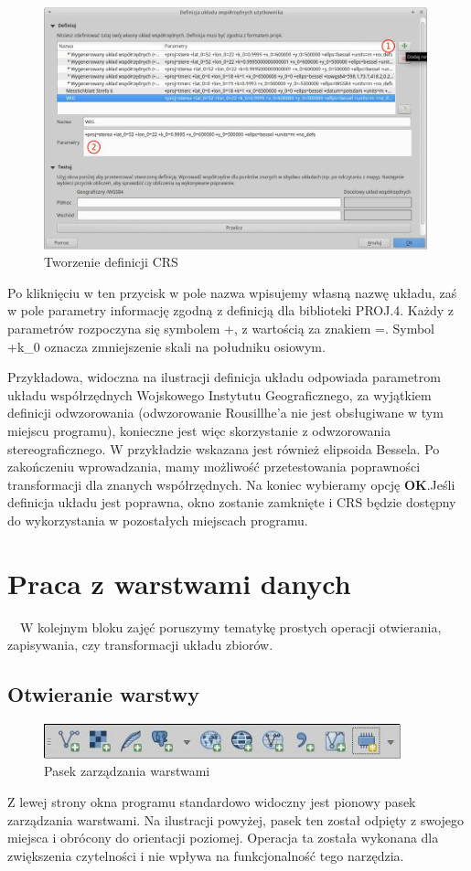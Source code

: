 \documentclass[12pt,a4paper]{book}
\begin{document}
\begin{figure}[ht]
	\centering
	\includegraphics[height=7cm]{002-crs.jpg}
	\caption{Tworzenie definicji CRS}
\end{figure}

Po kliknięciu w ten przycisk w pole nazwa wpisujemy własną nazwę układu, zaś w pole parametry informację zgodną z definicją dla biblioteki PROJ.4. Każdy z parametrów rozpoczyna się symbolem +, z wartością za znakiem =. Symbol +k\_0 oznacza zmniejszenie skali na południku osiowym.

Przykładowa, widoczna na ilustracji definicja układu odpowiada parametrom układu współrzędnych Wojskowego Instytutu Geograficznego, za wyjątkiem definicji odwzorowania (odwzorowanie Rousillhe'a nie jest obsługiwane w tym miejscu programu), konieczne jest więc skorzystanie z odwzorowania stereograficznego. W przykładzie wskazana jest również elipsoida Bessela. Po zakończeniu wprowadzania, mamy możliwość przetestowania poprawności transformacji dla znanych współrzędnych. Na koniec wybieramy opcję \textbf{OK}.Jeśli definicja układu jest poprawna, okno zostanie zamknięte i CRS będzie dostępny do wykorzystania w pozostałych miejscach programu.

\section{Praca z warstwami danych}
\ \ W kolejnym bloku zajęć poruszymy tematykę prostych operacji otwierania, zapisywania, czy transformacji układu zbiorów.

\subsection{Otwieranie warstwy}
\begin{figure}[ht]
	\centering
	\includegraphics[height=1cm]{002-pasek-warstwy.jpg}
	\caption{Pasek zarządzania warstwami}
\end{figure}
Z lewej strony okna programu standardowo widoczny jest pionowy pasek zarządzania warstwami. Na ilustracji powyżej, pasek ten został odpięty z swojego miejsca i obrócony do orientacji poziomej. Operacja ta została wykonana dla zwiększenia czytelności i nie wpływa na funkcjonalność tego narzędzia.
\end{document}

